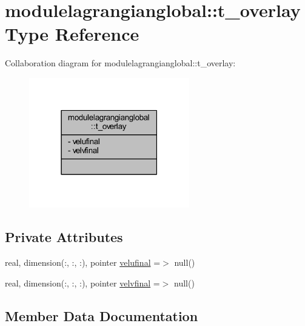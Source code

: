 \hypertarget{structmodulelagrangianglobal_1_1t__overlay}{}\section{modulelagrangianglobal\+:\+:t\+\_\+overlay Type Reference}
\label{structmodulelagrangianglobal_1_1t__overlay}


Collaboration diagram for modulelagrangianglobal\+:\+:t\+\_\+overlay\+:\nopagebreak
\begin{figure}[H]
\begin{center}
\leavevmode
\includegraphics[width=198pt]{structmodulelagrangianglobal_1_1t__overlay__coll__graph}
\end{center}
\end{figure}
\subsection*{Private Attributes}
\begin{DoxyCompactItemize}
\item 
real, dimension(\+:, \+:, \+:), pointer \mbox{\hyperlink{structmodulelagrangianglobal_1_1t__overlay_a8cc816e07ddae714688a955a7c22f571}{velufinal}} =$>$ null()
\item 
real, dimension(\+:, \+:, \+:), pointer \mbox{\hyperlink{structmodulelagrangianglobal_1_1t__overlay_a272b2d0ba6db0e45afbf63e22176872a}{velvfinal}} =$>$ null()
\end{DoxyCompactItemize}


\subsection{Member Data Documentation}
\mbox{\label{structmodulelagrangianglobal_1_1t__overlay_a8cc816e07ddae714688a955a7c22f571}} 
